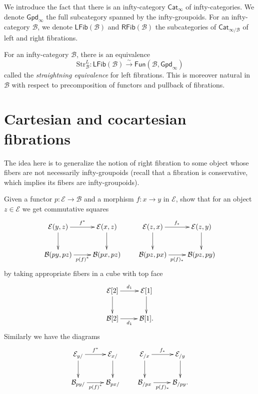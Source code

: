 \medskip\noindent
We introduce the fact that there is an
infty-category $\mathsf{Cat}_{\infty}$
of infty-categories. We denote
$\mathsf{Gpd}_{\infty}$
the full subcategory spanned by the
infty-groupoids.
For an infty-category $\mathcal{B}$,
we denote $\mathsf{LFib}(\mathcal{B})$ and
$\mathsf{RFib}(\mathcal{B})$
the subcategories of
$\mathsf{Cat}_{\infty/\mathcal{B}}$
of left and right fibrations.

\begin{theorem}[Lurie]
\label{theorem-lurie}
For an infty-category $\mathcal{B}$, there
is an equivalence
$$
\text{Str}_{\mathcal{B}}^L:\mathsf{LFib}
(\mathcal{B})
\overset{\sim}{\to}\mathsf{Fun}(\mathcal{B},
\mathsf{Gpd}_{\infty})
$$
called the {\it straightning equivalence} for
left fibrations.
This is moreover natural in $\mathcal{B}$
with respect
to precomposition of functors and pullback of
fibrations.
\end{theorem}

\section{Cartesian and cocartesian
fibrations}
\label{section-cartesian-fibrations}

\noindent
The idea here is to generalize the notion of
right fibration
to some object whose fibers are not
necessarily infty-groupoids
(recall that a fibration is conservative,
which implies its fibers
are infty-groupoids).

\begin{exercise}
\label{exercise-3.5}
Given a functor  $p: \mathcal{E} \to
\mathcal{B}$ and a morphism
$f: x \to y$ in $\mathcal{E}$, show that for
an object
$z \in \mathcal{E}$ we get commutative
squares
$$
\xymatrix{
\mathcal{E}(y,z)\ar[r]^{f^*}\ar[d]&
\mathcal{E}(x,z)\ar[d]\\
\mathcal{B}(py,pz)\ar[r]_{p(f)^*}&\mathcal{B}
(px,pz)
}
\qquad
\xymatrix{
\mathcal{E}(z,x)\ar[r]^{f_*}\ar[d]&
\mathcal{E}(z,y)\ar[d]\\
\mathcal{B}(pz,px)\ar[r]_{p(f)_*}&\mathcal{B}
(pz,py)
}
$$
by taking appropriate fibers in a cube with
top face
$$
\xymatrix{
\mathcal{E}[2]\ar[r]^{d_1}\ar[d]&\mathcal{E}
[1]\ar[d]\\
\mathcal{B}[2]\ar[r]_{d_1}&\mathcal{B}[1].
}
$$
Similarly we have the diagrams
$$
\xymatrix{
\mathcal{E}_{y/}\ar[r]^{f^*}\ar[d]&
\mathcal{E}_{x/}\ar[d]\\
\mathcal{B}_{py/}\ar[r]_{p(f)^*}&\mathcal{B}
_{px/}
}\qquad
\xymatrix{
\mathcal{E}_{/x}\ar[r]^{f_*}\ar[d]&
\mathcal{E}_{/y}\ar[d]\\
\mathcal{B}_{/px}\ar[r]_{p(f)_*}&\mathcal{B}
_{/py}.
}
$$
\end{exercise}

